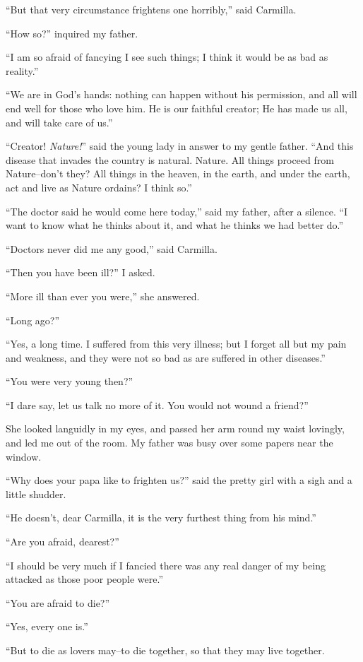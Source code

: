 \documentclass[11pt,twoside,makeidx,hidelinks,]{memoir}
\begin{document}
``But that very circumstance frightens one horribly,'' said Carmilla.

``How so?'' inquired my father.

``I am so afraid of fancying I see such things; I think it would be as
bad as reality.''

``We are in God's hands: nothing can happen without his permission, and
all will end well for those who love him. He is our faithful creator; He
has made us all, and will take care of us.''

``Creator! \emph{Nature!}'' said the young lady in answer to my gentle father.
``And this disease that invades the country is natural. Nature. All
things proceed from Nature--don't they? All things in the heaven, in the
earth, and under the earth, act and live as Nature ordains? I
think so.''

``The doctor said he would come here today,'' said my father, after a
silence. ``I want to know what he thinks about it, and what he thinks we
had better do.''

``Doctors never did me any good,'' said Carmilla.

``Then you have been ill?'' I asked.

``More ill than ever you were,'' she answered.

``Long ago?''

``Yes, a long time. I suffered from this very illness; but I forget all
but my pain and weakness, and they were not so bad as are suffered in
other diseases.''

``You were very young then?''

``I dare say, let us talk no more of it. You would not wound a friend?''

She looked languidly in my eyes, and passed her arm round my waist
lovingly, and led me out of the room. My father was busy over some
papers near the window.

``Why does your papa like to frighten us?'' said the pretty girl with a
sigh and a little shudder.

``He doesn't, dear Carmilla, it is the very furthest thing from his
mind.''

``Are you afraid, dearest?''

``I should be very much if I fancied there was any real danger of my
being attacked as those poor people were.''

``You are afraid to die?''

``Yes, every one is.''

``But to die as lovers may--to die together, so that they may live
together.
\end{document}
